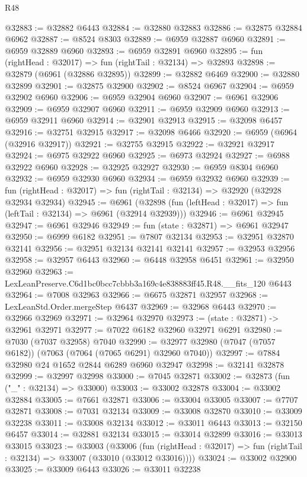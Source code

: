 \begin{lexlean}{R48}
\begin{coremodule}
@32883 := @32882 @6443
@32884 := @32880 @32883
@32886 := @32875 @32884 @6962
@32887 := @8524 @8303
@32889 := @6959 @32887 @6960
@32891 := @6959 @32889 @6960
@32893 := @6959 @32891 @6960
@32895 := fun (rightHead : @32017) => fun (rightTail : @32134) => @32893
@32898 := @32879 (@6961 (@32886 @32895))
@32899 := @32882 @6469
@32900 := @32880 @32899
@32901 := @32875 @32900
@32902 := @8524 @6967
@32904 := @6959 @32902 @6960
@32906 := @6959 @32904 @6960
@32907 := @6961 @32906
@32909 := @6959 @32907 @6960
@32911 := @6959 @32909 @6960
@32913 := @6959 @32911 @6960
@32914 := @32901 @32913
@32915 := @32098 @6457
@32916 := @32751 @32915
@32917 := @32098 @6466
@32920 := @6959 (@6964 (@32916 @32917))
@32921 := @32755 @32915
@32922 := @32921 @32917
@32924 := @6975 @32922 @6960
@32925 := @6973 @32924
@32927 := @6988 @32922 @6960
@32928 := @32925 @32927
@32930 := @6959 @8304 @6960
@32932 := @6959 @32930 @6960
@32934 := @6959 @32932 @6960
@32939 := fun (rightHead : @32017) => fun (rightTail : @32134) => @32920 (@32928 @32934 @32934)
@32945 := @6961
    (@32898 (fun (leftHead : @32017) => fun (leftTail : @32134) => @6961 (@32914 @32939)))
@32946 := @6961 @32945
@32947 := @6961 @32946
@32949 := fun (state : @32871) => @6961 @32947
@32950 := @6999 @6182
@32951 := @7807 @32134
@32953 := @32951 @32870 @32141
@32956 := @32951 @32134 @32141 @32141
@32957 := @32953 @32956
@32958 := @32957 @6443
@32960 := @6448 @32958 @6451
@32961 := @32950 @32960
@32963 := LexLeanPreserve.C6d1bc0bcc7cbbb3a169c4e838883ff45.R48.__fits_120 @6443
@32964 := @7008 @32963
@32966 := @6675 @32871 @32957
@32968 := LexLeanStd.Order.mergeStep @6437
@32969 := @32968 @6443
@32970 := @32966 @32969
@32971 := @32964 @32970
@32973 := (state : @32871) -> @32961 @32971
@32977 := @7022 @6182 @32960 @32971 @6291
@32980 := @7030 (@7037 @32958) @7040
@32990 := @32977 @32980 (@7047 (@7057 @6182)) (@7063 (@7064 (@7065 @6291) @32960 @7040))
@32997 := @7884 @32980 @24 @1652 @2844 @6289 @6960 @32947
@32998 := @32141 @32878
@32999 := @32997 @32998
@33000 := @7045 @32871
@33002 := @32873 (fun ("_" : @32134) => @33000)
@33003 := @33002 @32878
@33004 := @33002 @32884
@33005 := @7661 @32871
@33006 := @33004 @33005
@33007 := @7707 @32871
@33008 := @7031 @32134
@33009 := @33008 @32870
@33010 := @33009 @32238
@33011 := @33008 @32134
@33012 := @33011 @6443
@33013 := @32150 @6457
@33014 := @32881 @32134
@33015 := @33014 @32899
@33016 := @33013 @33015
@33023 := @33003
    (@33006
      (fun (rightHead : @32017) => fun (rightTail : @32134) => @33007 (@33010 (@33012 @33016))))
@33024 := @33002 @32900
@33025 := @33009 @6443
@33026 := @33011 @32238

\end{coremodule}
\end{lexlean}
